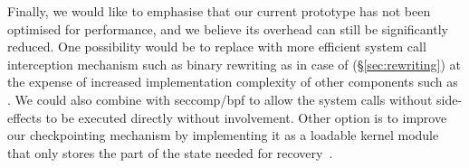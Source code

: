 Finally, we would like to emphasise that our current prototype has not
been optimised for performance, and we believe its overhead can still
be significantly reduced.  
One possibility would be to replace \ptrace with more efficient system
call interception mechanism such as binary rewriting as in case of
\varan (\S\ref{sec:rewriting}) at the expense of increased
implementation complexity of other components such as \rem. We could
also combine \ptrace with \textsf{seccomp/bpf} to allow the system calls
without side-effects to be executed directly without \mxm involvement.
Other option is to improve our checkpointing mechanism by implementing
it as a loadable kernel module that only stores the part of the state
needed for recovery~\cite{flashback}.






